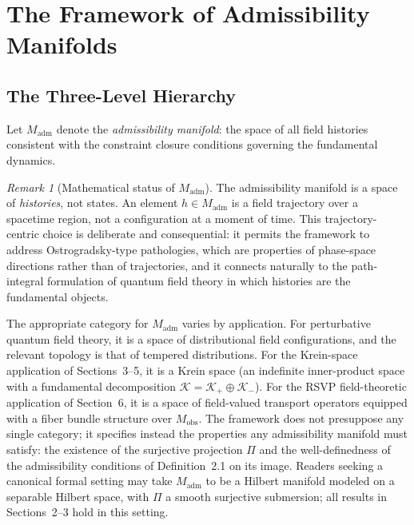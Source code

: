 \documentclass[12pt,a4paper]{article}
\theoremstyle{remark}
\newtheorem{remark}{Remark}[section]
\begin{document}
\section{The Framework of Admissibility Manifolds}

\subsection{The Three-Level Hierarchy}

Let $M_{\mathrm{adm}}$ denote the \emph{admissibility manifold}: the space
of all field histories consistent with the constraint closure conditions
governing the fundamental dynamics.

\begin{remark}[Mathematical status of $M_{\mathrm{adm}}$]
The admissibility manifold is a space of \emph{histories}, not states. An
element $h \in M_{\mathrm{adm}}$ is a field trajectory over a spacetime
region, not a configuration at a moment of time. This trajectory-centric
choice is deliberate and consequential: it permits the framework to address
Ostrogradsky-type pathologies, which are properties of phase-space
directions rather than of trajectories, and it connects naturally to the
path-integral formulation of quantum field theory in which histories are
the fundamental objects.

The appropriate category for $M_{\mathrm{adm}}$ varies by application.
For perturbative quantum field theory, it is a space of distributional
field configurations, and the relevant topology is that of tempered
distributions. For the Krein-space application of Sections~3--5, it is
a Krein space (an indefinite inner-product space with a fundamental
decomposition $\mathcal{K} = \mathcal{K}_+ \oplus \mathcal{K}_-$). For
the RSVP field-theoretic application of Section~6, it is a space of
field-valued transport operators equipped with a fiber bundle structure
over $M_{\mathrm{obs}}$. The framework does not presuppose any single
category; it specifies instead the properties any admissibility manifold
must satisfy: the existence of the surjective projection $\Pi$ and the
well-definedness of the admissibility conditions of Definition~2.1 on its
image. Readers seeking a canonical formal setting may take $M_{\mathrm{adm}}$
to be a Hilbert manifold modeled on a separable Hilbert space, with $\Pi$
a smooth surjective submersion; all results in Sections~2--3 hold in
this setting.
\end{remark}
\end{document}
